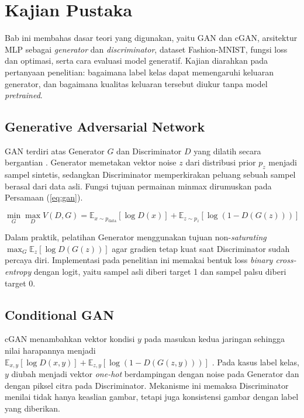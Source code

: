 \chapter{Kajian Pustaka}

Bab ini membahas dasar teori yang digunakan, yaitu GAN dan cGAN, arsitektur MLP sebagai \textit{generator} dan \textit{discriminator}, dataset Fashion-MNIST, fungsi loss dan optimasi, serta cara evaluasi model generatif. Kajian diarahkan pada pertanyaan penelitian: bagaimana label kelas dapat memengaruhi keluaran generator, dan bagaimana kualitas keluaran tersebut diukur tanpa model \textit{pretrained}.

\section{Generative Adversarial Network}

GAN terdiri atas Generator $G$ dan Discriminator $D$ yang dilatih secara bergantian \citep{goodfellow2014generative}. Generator memetakan vektor noise $z$ dari distribusi prior $p_z$ menjadi sampel sintetis, sedangkan Discriminator memperkirakan peluang sebuah sampel berasal dari data asli. Fungsi tujuan permainan minmax dirumuskan pada Persamaan (\ref{eq:gan}).

\begin{equation}\label{eq:gan}
\min_{G}\max_{D} V(D,G) = \mathbb{E}_{x\sim p_{\text{data}}}[\log D(x)] + \mathbb{E}_{z\sim p_z}[\log(1-D(G(z)))]
\end{equation}

Dalam praktik, pelatihan Generator menggunakan tujuan non-\textit{saturating} $\max_G \mathbb{E}_{z}[\log D(G(z))]$ agar gradien tetap kuat saat Discriminator sudah percaya diri. Implementasi pada penelitian ini memakai bentuk loss \textit{binary cross-entropy} dengan logit, yaitu sampel asli diberi target 1 dan sampel palsu diberi target 0.

\section{Conditional GAN}

cGAN menambahkan vektor kondisi $y$ pada masukan kedua jaringan sehingga nilai harapannya menjadi $\mathbb{E}_{x,y}[\log D(x,y)] + \mathbb{E}_{z,y}[\log(1-D(G(z,y)))]$ \citep{mirza2014conditional}. Pada kasus label kelas, $y$ diubah menjadi vektor \textit{one-hot} berdampingan dengan noise pada Generator dan dengan piksel citra pada Discriminator. Mekanisme ini memaksa Discriminator menilai tidak hanya keaslian gambar, tetapi juga konsistensi gambar dengan label yang diberikan.

